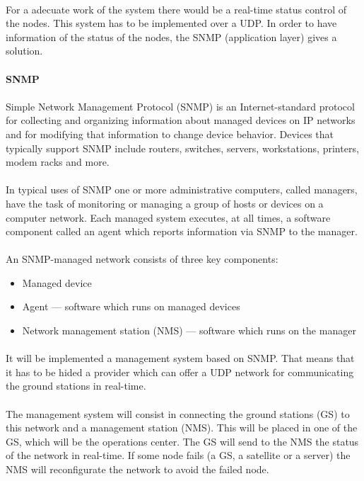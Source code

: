 \paragraph{}
For a adecuate work of the system there would be a real-time status control of the nodes. This system has to be implemented over a UDP. In order to have information of the status of the nodes, the SNMP (application layer) gives a solution.

\paragraph{} \textbf{SNMP}
\paragraph{} 
Simple Network Management Protocol (SNMP) is an Internet-standard protocol for collecting and organizing information about managed devices on IP networks and for modifying that information to change device behavior. Devices that typically support SNMP include routers, switches, servers, workstations, printers, modem racks and more.
\paragraph{}
In typical uses of SNMP one or more administrative computers, called managers, have the task of monitoring or managing a group of hosts or devices on a computer network. Each managed system executes, at all times, a software component called an agent which reports information via SNMP to the manager.
\paragraph{}
An SNMP-managed network consists of three key components:
\begin{itemize}
\item Managed device
\item Agent — software which runs on managed devices
\item Network management station (NMS) — software which runs on the manager
\end{itemize}

\paragraph{}
It will be implemented a management system based on SNMP. That means that it has to be hided a provider which can offer a UDP network for communicating the ground stations in real-time. 
\paragraph{}
The management system will consist in connecting the ground stations (GS) to this network and a management station (NMS). This will be placed in one of the GS, which will be the operations center. The GS will send to the NMS the status of the network in real-time. If some node fails (a GS, a satellite or a server) the NMS will reconfigurate the network to avoid the failed node. 